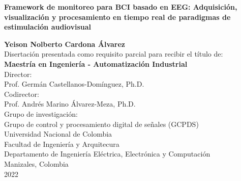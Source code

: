 \begin{center}

    \thispagestyle{empty} 
    \vspace*{2cm} 
    
    \begin{spacing}{1.9} 
        \textbf{\huge Framework de monitoreo para BCI basado en EEG: Adquisición, visualización y procesamiento en tiempo real de paradigmas de estimulación audiovisual}\\[1.0cm]
    \end{spacing}

    \Large
        \textbf{Yeison Nolberto Cardona Álvarez}\\[2.0cm]
    
    \small 
        Disertación presentada como requisito parcial para recibir el título de:\\
        \textbf{Maestría en Ingeniería - Automatización Industrial}\\[1cm]
        
        Director:\\
        Prof. Germán Castellanos-Domínguez, Ph.D.\\[0.25cm]
        
        Codirector:\\
        Prof. Andrés Marino Álvarez-Meza, Ph.D.\\[1cm]
        
        Grupo de investigación:\\
        Grupo de control y procesamiento digital de señales (GCPDS)\\[1cm]
        
        Universidad Nacional de Colombia\\
        Facultad de Ingeniería y Arquitecura\\ 
        Departamento de Ingeniería Eléctrica, Electrónica y Computación\\
        Manizales, Colombia\\
        2022\\

\end{center}




\restoregeometry 